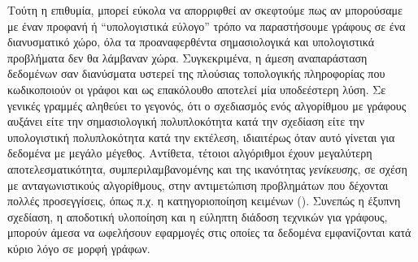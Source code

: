Τούτη η επιθυμία, μπορεί εύκολα να απορριφθεί αν σκεφτούμε πως αν μπορούσαμε με έναν προφανή ή ``υπολογιστικά εύλογο'' τρόπο να παραστήσουμε γράφους σε ένα διανυσματικό χώρο, όλα τα προαναφερθέντα σημασιολογικά και υπολογιστικά προβλήματα δεν θα λάμβαναν χώρα.
Συγκεκριμένα, η άμεση αναπαράσταση δεδομένων σαν διανύσματα υστερεί της πλούσιας τοπολογικής πληροφορίας που κωδικοποιούν οι γράφοι και ως επακόλουθο αποτελεί μία υποδεέστερη λύση.
Σε γενικές γραμμές αληθεύει το γεγονός, ότι ο σχεδιασμός ενός αλγορίθμου με γράφους αυξάνει είτε την σημασιολογική πολυπλοκότητα κατά την σχεδίαση είτε την υπολογιστική πολυπλοκότητα κατά την εκτέλεση, ιδιαιτέρως όταν αυτό γίνεται για δεδομένα με μεγάλο μέγεθος.
Αντίθετα, τέτοιοι αλγόριθμοι έχουν μεγαλύτερη αποτελεσματικότητα, συμπεριλαμβανομένης και της ικανότητας \textit{γενίκευσης}, σε σχέση με ανταγωνιστικούς αλγορίθμους, στην αντιμετώπιση προβλημάτων που δέχονται πολλές προσεγγίσεις, όπως π.χ. η κατηγοριοποίηση κειμένων ().
Συνεπώς η έξυπνη σχεδίαση, η αποδοτική υλοποίηση και η εύληπτη διάδοση τεχνικών για γράφους, μπορούν άμεσα να ωφελήσουν εφαρμογές στις οποίες τα δεδομένα εμφανίζονται κατά κύριο λόγο σε μορφή γράφων.
